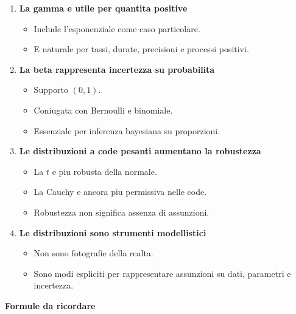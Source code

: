 \documentclass[
  italian,
  letterpaper,
  a4paper,
  11pt,
  open=any]{scrbook}
\providecommand{\tightlist}{%
  \setlength{\itemsep}{0pt}\setlength{\parskip}{0pt}}
\theoremstyle{plain}
\theoremstyle{definition}
\theoremstyle{definition}
\theoremstyle{remark}
\begin{document}
\begin{tcolorbox}
\begin{enumerate}
  \begin{itemize}
  \tightlist
  \item
    Utile per errori additivi, punteggi standardizzati, effetti
    continui.
  \item
    Non adatta automaticamente a tempi, conteggi, proporzioni o scale
    ordinali.
  \end{itemize}
\item
  \textbf{La gamma e utile per quantita positive}

  \begin{itemize}
  \tightlist
  \item
    Include l'esponenziale come caso particolare.
  \item
    E naturale per tassi, durate, precisioni e processi positivi.
  \end{itemize}
\item
  \textbf{La beta rappresenta incertezza su probabilita}

  \begin{itemize}
  \tightlist
  \item
    Supporto \((0,1)\).
  \item
    Coniugata con Bernoulli e binomiale.
  \item
    Essenziale per inferenza bayesiana su proporzioni.
  \end{itemize}
\item
  \textbf{Le distribuzioni a code pesanti aumentano la robustezza}

  \begin{itemize}
  \tightlist
  \item
    La \(t\) e piu robusta della normale.
  \item
    La Cauchy e ancora piu permissiva nelle code.
  \item
    Robustezza non significa assenza di assunzioni.
  \end{itemize}
\item
  \textbf{Le distribuzioni sono strumenti modellistici}

  \begin{itemize}
  \tightlist
  \item
    Non sono fotografie della realta.
  \item
    Sono modi espliciti per rappresentare assunzioni su dati, parametri
    e incertezza.
  \end{itemize}
\end{enumerate}

\textbf{Formule da ricordare}


\end{tcolorbox}
\end{document}
